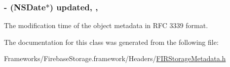 \subsubsection[{updated}]{\setlength{\rightskip}{0pt plus 5cm}-\/ (N\+S\+Date$\ast$) updated\hspace{0.3cm}{\ttfamily [read]}, {\ttfamily [nonatomic]}, {\ttfamily [copy]}}\label{interface_f_i_r_storage_metadata_aae35491c0e2247378e80a4347cfe9d5c}
The modification time of the object metadata in R\+F\+C 3339 format. 

The documentation for this class was generated from the following file\+:\begin{DoxyCompactItemize}
\item 
Frameworks/\+Firebase\+Storage.\+framework/\+Headers/\hyperlink{_f_i_r_storage_metadata_8h}{F\+I\+R\+Storage\+Metadata.\+h}\end{DoxyCompactItemize}
